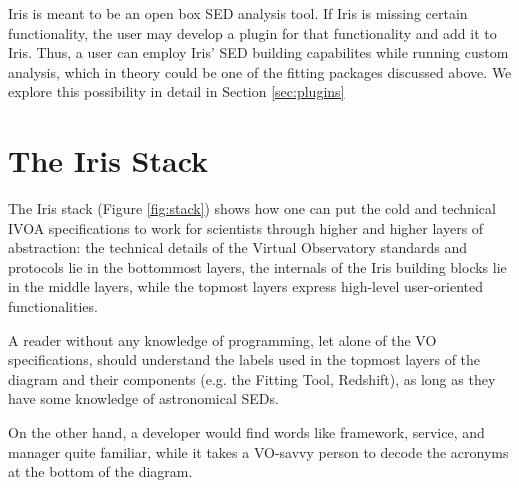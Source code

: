 \documentclass[5p]{elsarticle}
\begin{document}
Iris is meant to be an open box SED analysis tool. If Iris is missing certain functionality, the user may develop a plugin for that functionality and add it to Iris. Thus, a user can employ Iris' SED building capabilites while running custom analysis, which in theory could be one of the fitting packages discussed above. We explore this possibility in detail in Section \ref{sec:plugins}



%

\section{The Iris Stack}
\label{sec:stack}

The Iris stack (Figure \ref{fig:stack}) shows how one can put the cold and technical IVOA specifications to work for scientists through higher and higher layers of abstraction: the technical details of the Virtual Observatory standards and protocols lie in the bottommost layers, the internals of the Iris building blocks lie in the middle layers, while the topmost layers express high-level user-oriented functionalities.

A reader without any knowledge of programming, let alone of the VO specifications, should understand the labels used in the topmost layers of the diagram and their components (e.g. the Fitting Tool, Redshift), as long as they have some knowledge of astronomical SEDs.

On the other hand, a developer would find words like framework, service, and manager quite familiar, while it takes a VO-savvy person to decode the acronyms at the bottom of the diagram.
\end{document}
